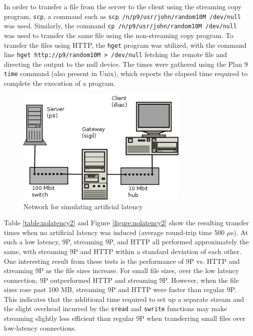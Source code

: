 \documentclass[11pt,american]{report}
\begin{document}
In order to transfer a file from the server to the client using the streaming copy program, {\tt scp}, a command such as {\footnotesize {\tt scp /n/p9/usr/john/random10M /dev/null}} was used. Similarly, the command {\footnotesize{\tt cp /n/p9/usr/john/random10M /dev/null}} was used to transfer the same file using the non-streaming copy program. To transfer the files using HTTP, the {\tt hget} program was utilized, with the command line {\footnotesize{\tt hget http://p9/random10M > /dev/null}} fetching the remote file and directing the output to the null device. The times were gathered using the Plan 9 {\tt time} command (also present in Unix), which reports the elapsed time required to complete the execution of a program.

\begin{figure}[h]
	\begin{center}
		\includegraphics[width=0.75\textwidth]{network.png}
	\end{center}
	\caption{Network for simulating artificial latency}
	\label{figure:network2}
\end{figure}

Table \ref{table:nolatency2} and Figure \ref{figure:nolatency2} show the resulting transfer times when no artificial latency was induced (average round-trip time 500 $\mu$s). At such a low latency, 9P, streaming 9P, and HTTP all performed approximately the same, with streaming 9P and HTTP within a standard deviation of each other. One interesting result from these tests is the performance of 9P vs. HTTP and streaming 9P as the file sizes increase. For small file sizes, over the low latency connection, 9P outperformed HTTP and streaming 9P. However, when the file sizes rose past 100 MB, streaming 9P and HTTP were faster than regular 9P. This indicates that the additional time required to set up a separate stream and the slight overhead incurred by the {\tt sread} and {\tt swrite} functions may make streaming slightly less efficient than regular 9P when transferring small files over low-latency connections.
\end{document}
